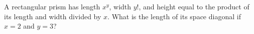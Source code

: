 A rectangular prism has length $x^y$, width $y!$, and height equal to the product of its length and width divided by $x$. What is the length of its space diagonal if $x=2$ and $y=3$?
